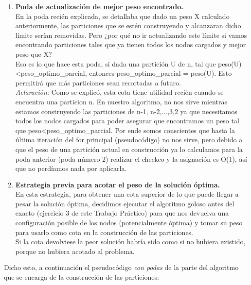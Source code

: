 \documentclass[10pt,a4paper]{article}
\begin{document}
\begin{enumerate}
\item \textbf{Poda de actualización de mejor peso encontrado.}\\
En la poda recién explicada, se detallaba que dado un peso X calculado anteriormente, las particiones que se estén construyendo y alcanzaran dicho límite serían removidas. Pero ¿por qué no ir actualizando este límite si vamos encontrando particiones tales que ya tienen todos los nodos cargados y mejor peso que X?\\
Eso es lo que hace esta poda, si dada una partición U de n, tal que peso(U)\textless peso\_optimo\_parcial, entonces peso\_optimo\_parcial = peso(U). Esto permitirá que más particiones sean recortadas a futuro.\\
\textit{Aclaración:} Como se explicó, esta cota tiene utilidad recién cuando se encuentra una particion n. En nuestro algoritmo, no nos sirve mientras estamos construyendo las particiones de n-1, n-2,...,3,2 ya que necesitamos todos los nodos cargados para poder asegurar que encontramos un peso tal que peso\textless peso\_optimo\_parcial. Por ende somos conscientes que hasta la última iteración del for principal (pseudocódigo) no nos sirve, pero debido a que el peso de una partición actual en construcción ya lo calculamos para la poda anterior (poda número 2) realizar el checkeo y la asignación es O(1), así que no perdíamos nada por aplicarla.\\

\item \textbf{Estrategia previa para acotar el peso de la solución óptima.}\\
En esta estrategia, para obtener una cota superior de lo que puede llegar a pesar la solución óptima, decidimos ejecutar el algoritmo goloso antes del exacto (ejercicio 3 de este Trabajo Práctico) para que nos devuelva una configuración posible de los nodos (potencialmente óptima) y tomar su peso para usarlo como cota en la construcción de las particiones.\\
Si la cota devolviese la peor solución habría sido como si no hubiera existido, porque no hubiera acotado al problema.\\
\end{enumerate}

Dicho esto, a continuación el pseudocódigo \textit{con podas} de la parte del algoritmo que se encarga de la construcción de las particiones:\\
\end{document}
